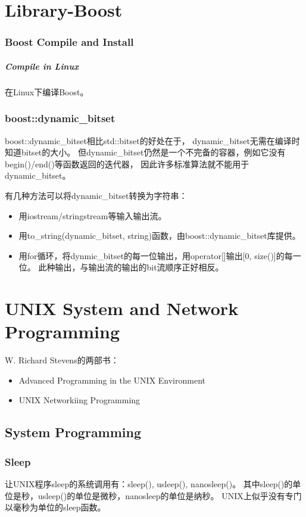 \documentclass[a4paper,11pt,oneside,openany]{book}
\begin{document}
\begin{CJK*}{GBK}{song}
\chapter{Library-Boost}
\subsection{Boost Compile and Install}
\paragraph{Compile in Linux}
在Linux下编译Boost。

\subsection{boost::dynamic\_bitset}
boost::dynamic\_bitset相比std::bitset的好处在于，
dynamic\_bitset无需在编译时知道bitset的大小。
但dynamic\_bitset仍然是一个不完备的容器，例如它没有begin()/end()等函数返回的迭代器，
因此许多标准算法就不能用于dynamic\_bitset。

有几种方法可以将dynamic\_bitset转换为字符串：
\begin{itemize}
\item 用iostream/stringstream等输入输出流。
\item 用to\_string(dynamic\_bitset, string)函数，由boost::dynamic\_bitset库提供。
\item 用for循环，将dynmic\_bitset的每一位输出，用operator[]输出[0, size()]的每一位。
此种输出，与输出流的输出的bit流顺序正好相反。
\end{itemize}

\chapter{UNIX System and Network Programming}
W. Richard Stevens的两部书：
\begin{itemize}
\item Advanced Programming in the UNIX Environment
\item UNIX Networkiing Programming
\end{itemize}

\section{System Programming}
\subsection{Sleep}
让UNIX程序sleep的系统调用有：sleep(), usleep(), nanosleep()。
其中sleep()的单位是秒，usleep()的单位是微秒，nanosleep的单位是纳秒。
UNIX上似乎没有专门以毫秒为单位的sleep函数。



\end{CJK*}
\end{document}

